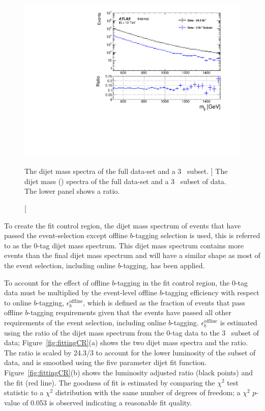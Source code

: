 \begin{figure}[!htb]
\captionsetup[subfigure]{aboveskip=0pt,justification=centering}
\centering
\includegraphics[width=0.7\linewidth, angle=0]{figs/Dibjet/LowMass/FitStudy/subset_dataComp.pdf}
\vspace{-1em}
\caption
    [ The dijet mass  spectra of the full \lm{} data-set and a 3~\ifb{} subset.
      ]
    {\label{fig:fittingDataSubset}
      The dijet mass (\mjj{}) spectra of the full \lm{} data-set and a 3~\ifb{} subset of \lm{} data.
      The lower panel shows a ratio.}
    \vspace{-1em}
\end{figure}

To create the \lm{} fit control region,
the dijet mass spectrum of events that have passed the
\lm{} event-selection except offline $b$-tagging selection is used,
this is referred to as the 0-tag dijet mass spectrum.
This dijet mass spectrum contains more events than the final dijet mass spectrum
and will have a similar shape as most of the event selection, including online $b$-tagging, has been applied.

To account for the effect of offline $b$-tagging in the fit control region,
the 0-tag data must be multiplied by the event-level offline $b$-tagging efficiency with respect to online $b$-tagging, $\epsilon_b^{\text{offline}}$,
which is defined as the fraction of events that pass offline $b$-tagging requirements given
that the events have passed all other requirements of the \lm{} event selection, including online $b$-tagging.
$\epsilon_b^{\text{offline}}$ is estimated using the ratio
of the dijet mass spectrum from the 0-tag data to the 3~\ifb{} subset of data;
Figure~\ref{fig:fittingCR}(a) shows the two dijet mass spectra and the ratio.
The ratio is scaled by 24.3/3 to account for the lower luminosity of the subset of data,
and is smoothed using the five parameter dijet fit function.
Figure~\ref{fig:fittingCR}(b) shows the luminosity adjusted ratio (black points) and the fit (red line).
The goodness of fit is estimated by comparing the $\chi^2$ test statistic to a $\chi^2$ distribution with the same number of degrees of freedom;
a $\chi^2$ $p$-value of 0.053 is observed indicating a reasonable fit quality.

